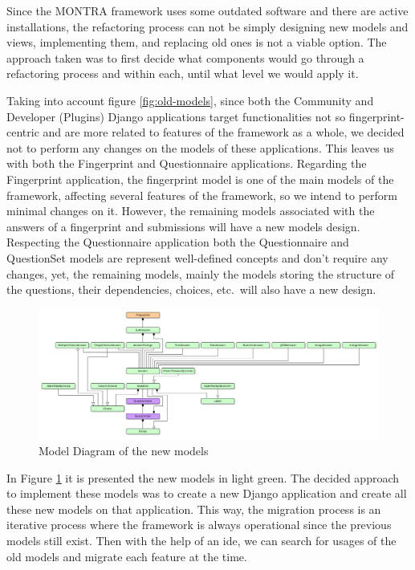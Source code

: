 Since the MONTRA framework uses some outdated software and there are active installations, the refactoring process can not be simply designing new models and views, implementing them, and replacing old ones is not a viable option.
The approach taken was to first decide what components would go through a refactoring process and within each, until what level we would apply it.

Taking into account figure \ref{fig:old-models}, since both the Community and Developer (Plugins) Django applications target functionalities not so fingerprint-centric and are more related to features of the framework as a whole, we decided not to perform any changes on the models of these applications.
This leaves us with both the Fingerprint and Questionnaire applications.
Regarding the Fingerprint application, the fingerprint model is one of the main models of the framework, affecting several features of the framework, so we intend to perform minimal changes on it.
However, the remaining models associated with the answers of a fingerprint and submissions will have a new models design.
Respecting the Questionnaire application both the Questionnaire and QuestionSet models are represent well-defined concepts and don't require any changes, yet, the remaining models, mainly the models storing the structure of the questions, their dependencies, choices, etc.\, will also have a new design.

\begin{figure}
    \center
    \includegraphics[width=\textwidth]{new-models}
    \caption{Model Diagram of the new models}
    \label{fig:new-models}
\end{figure}

In Figure \ref{fig:new-models} it is presented the new models in light green.
The decided approach to implement these models was to create a new Django application and create all these new models on that application.
This way, the migration process is an iterative process where the framework is always operational since the previous models still exist.
Then with the help of an \gls{ide}, we can search for usages of the old models and migrate each feature at the time.

